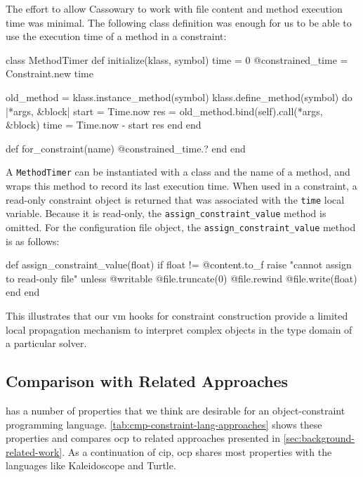 The effort to allow Cassowary to work with file content and method
execution time was minimal. The following class definition was enough
for us to be able to use the execution time of a method in a
constraint:
\begin{code}
class MethodTimer
  def initialize(klass, symbol)
    time = 0
    @constrained_time = Constraint.new { time }

    old_method = klass.instance_method(symbol)
    klass.define_method(symbol) do |*args, &block|
      start = Time.now
      res = old_method.bind(self).call(*args, &block)
      time = Time.now - start
      res
    end
  end

  def for_constraint(name)
    @constrained_time.?
  end
end
\end{code}

A \lstinline{MethodTimer} can be instantiated with a class and the
name of a method, and wraps this method to record its last execution
time. When used in a constraint, a read-only constraint object is
returned that was associated with the \lstinline{time} local
variable. Because it is read-only, the
\lstinline{assign_constraint_value} method is omitted. For the
configuration file object, the \lstinline{assign_constraint_value}
method is as follows:
\begin{code}
  def assign_constraint_value(float)
    if float != @content.to_f
      raise "cannot assign to read-only file" unless @writable
      @file.truncate(0)
      @file.rewind
      @file.write(float)
    end
  end
\end{code}

This illustrates that our \ac{vm} hooks for constraint construction
provide a limited local propagation mechanism to interpret complex
objects in the type domain of a particular solver.

\subsection{Comparison with Related Approaches}
\label{sec:comparison}

\langname has a number of properties that we think are desirable for
an object-constraint programming
language. \autoref{tab:cmp-constraint-lang-approaches} shows these
properties and compares \ac{ocp} to related approaches presented in
\autoref{sec:background-related-work}.  As a continuation of
\ac{cip}, \ac{ocp} shares most properties with the languages like
Kaleidoscope and Turtle.

